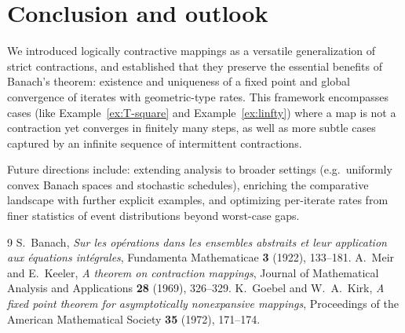 \documentclass[11pt]{article}
\theoremstyle{definition}
\theoremstyle{remark}
\begin{document}
\section{Conclusion and outlook}
We introduced logically contractive mappings as a versatile generalization of strict contractions, and established that they preserve the essential benefits of Banach's theorem: existence and uniqueness of a fixed point and global convergence of iterates with geometric-type rates. This framework encompasses cases (like Example~\ref{ex:T-square} and Example~\ref{ex:linfty}) where a map is not a contraction yet converges in finitely many steps, as well as more subtle cases captured by an infinite sequence of intermittent contractions.

Future directions include: extending analysis to broader settings (e.g.\ uniformly convex Banach spaces and stochastic schedules), enriching the comparative landscape with further explicit examples, and optimizing per-iterate rates from finer statistics of event distributions beyond worst-case gaps.

\begin{thebibliography}{9}
 S.~Banach, \emph{Sur les opérations dans les ensembles abstraits et leur application aux équations intégrales}, Fundamenta Mathematicae \textbf{3} (1922), 133--181.
 A.~Meir and E.~Keeler, \emph{A theorem on contraction mappings}, Journal of Mathematical Analysis and Applications \textbf{28} (1969), 326--329.
 K.~Goebel and W.~A.~Kirk, \emph{A fixed point theorem for asymptotically nonexpansive mappings}, Proceedings of the American Mathematical Society \textbf{35} (1972), 171--174.
\end{thebibliography}
\end{document}
